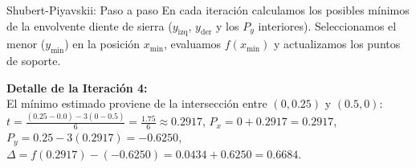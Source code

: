 \begin{frame}{Shubert-Piyavskii: Paso a paso}
\small
En cada iteración calculamos los posibles mínimos de la envolvente diente de sierra (\(y_{\text{izq}}\), \(y_{\text{der}}\) y los \(P_y\) interiores). Seleccionamos el menor (\(y_{\min}\)) en la posición \(x_{\min}\), evaluamos \(f(x_{\min})\) y actualizamos los puntos de soporte.

\vspace{0.25cm}
\centering
\renewcommand{\arraystretch}{1.25}

\vspace{0.25cm}
\raggedright
\footnotesize
\textbf{Detalle de la Iteración 4:} \\
El mínimo estimado proviene de la intersección entre \((0, 0.25)\) y \((0.5, 0)\): \\
\(t = \frac{(0.25 - 0.0) - 3(0 - 0.5)}{6} = \frac{1.75}{6} \approx 0.2917\), \quad 
\(P_x = 0 + 0.2917 = \mathbf{0.2917}\), \\
\(P_y = 0.25 - 3(0.2917) = \mathbf{-0.6250}\), \quad 
\(\Delta = f(0.2917) - (-0.6250) = 0.0434 + 0.6250 = \mathbf{0.6684}\).
\end{frame}


